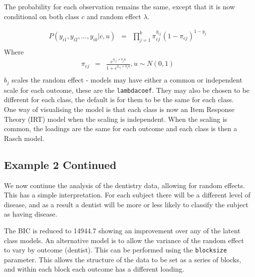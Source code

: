 The probability for each observation remains the same, except that it is now conditional on both class $c$ and random effect $\lambda$.

\begin{eqnarray*}
P\left(y_{i1},y_{i2},...,y_{ik}|c,u\right)&=&\prod_{j=1}^k \pi_{cj}^{y_{ij}} \left(1-\pi_{cj}\right)^{1-y_j}\\
\end{eqnarray*}
Where
\begin{eqnarray*}
\pi_{cj}&=&\frac{e^{a_{cj}+b_ju}}{1+e^{a_{cj}+b_ju}},u\sim N(0,1)\\
\end{eqnarray*}
$b_j$ scales the random effect - models may have either a common or independent scale for each outcome, these are the \texttt{lambdacoef}. They may also be chosen to be different for each class, the default is for them to be the same for each class. \\

One way of visualising the model is that each class is now an Item Response Theory (IRT) model when the scaling is independent. When the scaling is common, the loadings are the same for each outcome and each class is then a Rasch model.

\subsection{Example 2 Continued}

We now continue the analysis of the dentistry data, allowing for random effects. This has a simple interpretation. For each subject there will be a different level of disease, and as a result a dentist will be more or less likely to classify the subject as having disease.



\begin{Schunk}
\end{Schunk}

The BIC is reduced to 14944.7 showing an improvement over any of the latent class models. An alternative model is to allow the variance of the random effect to vary by outcome (dentist). This can be performed using the \texttt{blocksize} parameter. This allows the structure of the data to be set as a series of blocks, and within each block each outcome has a different loading.

